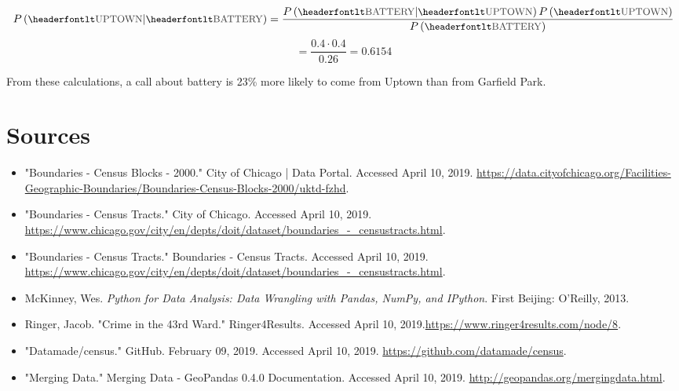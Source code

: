\documentclass[11pt]{article}
\newcommand{\printsubsection}[1]{\normalfont\headerfontlt\textcolor{darkgray}{{#1}}}
\newcommand{\opns}[1]{\textrm{\small\printsubsection{\MakeUppercase{#1}}}}
\begin{document}
$$ P\left(\opns{UPTOWN} \middle\vert \opns{BATTERY} \right) = \frac{P\left( \opns{BATTERY} \middle\vert \opns{UPTOWN}\right) P\left( \opns{UPTOWN}\right) }{P\left(\opns{BATTERY}\right)}$$
$$ = \frac{0.4\cdot 0.4}{0.26} = 0.6154 $$

From these calculations, a call about battery is 23\% more likely to come from Uptown than from Garfield Park.
\pagebreak
\section*{Sources}
\begin{itemize}

\item "Boundaries - Census Blocks - 2000." City of Chicago | Data Portal. Accessed April 10, 2019. \url{https://data.cityofchicago.org/Facilities-Geographic-Boundaries/Boundaries-Census-Blocks-2000/uktd-fzhd}.

\item "Boundaries - Census Tracts." City of Chicago. Accessed April 10, 2019. \url{https://www.chicago.gov/city/en/depts/doit/dataset/boundaries_-_censustracts.html}.

\item "Boundaries - Census Tracts." Boundaries - Census Tracts. Accessed April 10, 2019. \url{https://www.chicago.gov/city/en/depts/doit/dataset/boundaries_-_censustracts.html}.

\item  McKinney, Wes. \textit{Python for Data Analysis: Data Wrangling with Pandas, NumPy, and IPython}. First Beijing: O'Reilly, 2013. 

\item Ringer, Jacob. "Crime in the 43rd Ward." Ringer4Results. Accessed April 10, 2019.\url{https://www.ringer4results.com/node/8}.

\item "Datamade/census." GitHub. February 09, 2019. Accessed April 10, 2019. \url{https://github.com/datamade/census}.

\item "Merging Data." Merging Data - GeoPandas 0.4.0 Documentation. Accessed April 10, 2019. \url{http://geopandas.org/mergingdata.html}.
\end{itemize}
\end{document}
